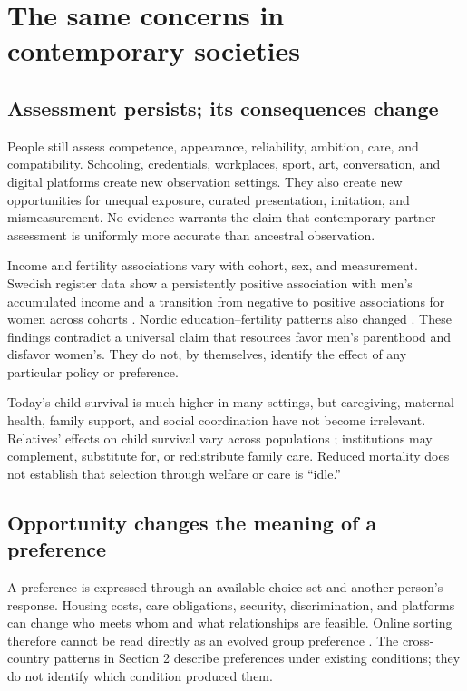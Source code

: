 \documentclass[10pt,twocolumn,letterpaper]{article}
\begin{document}
\section{The same concerns in contemporary societies}
\subsection{Assessment persists; its consequences change}
People still assess competence, appearance, reliability, ambition, care, and compatibility. Schooling, credentials, workplaces, sport, art, conversation, and digital platforms create new observation settings. They also create new opportunities for unequal exposure, curated presentation, imitation, and mismeasurement. No evidence warrants the claim that contemporary partner assessment is uniformly more accurate than ancestral observation.

Income and fertility associations vary with cohort, sex, and measurement. Swedish register data show a persistently positive association with men's accumulated income and a transition from negative to positive associations for women across cohorts \citep{kolk2023}. Nordic education--fertility patterns also changed \citep{jalovaara2019}. These findings contradict a universal claim that resources favor men's parenthood and disfavor women's. They do not, by themselves, identify the effect of any particular policy or preference.

Today's child survival is much higher in many settings, but caregiving, maternal health, family support, and social coordination have not become irrelevant. Relatives' effects on child survival vary across populations \citep{sear2008}; institutions may complement, substitute for, or redistribute family care. Reduced mortality does not establish that selection through welfare or care is ``idle.''

\subsection{Opportunity changes the meaning of a preference}
A preference is expressed through an available choice set and another person's response. Housing costs, care obligations, security, discrimination, and platforms can change who meets whom and what relationships are feasible. Online sorting therefore cannot be read directly as an evolved group preference \citep{lewis,bruch}. The cross-country patterns in Section 2 describe preferences under existing conditions; they do not identify which condition produced them.
\end{document}
